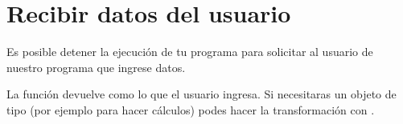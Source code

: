 \documentclass[a4paper,12pt,spanish]{sphinxmanual}
\begin{document}
\sphinxstepscope


\chapter{Recibir datos del usuario }
\label{\detokenize{input:recibir-datos-del-usuario-input}}\label{\detokenize{input::doc}}
\sphinxAtStartPar
Es posible detener la ejecución de tu programa para solicitar
al usuario de nuestro programa que ingrese datos.

\begin{sphinxVerbatim}[commandchars=\\\{\}]
  
  
\end{sphinxVerbatim}

\sphinxAtStartPar
La función  devuelve como  lo que el usuario ingresa.
Si necesitaras un objeto de tipo  (por ejemplo para hacer cálculos)
podes hacer la transformación con .
\end{document}

